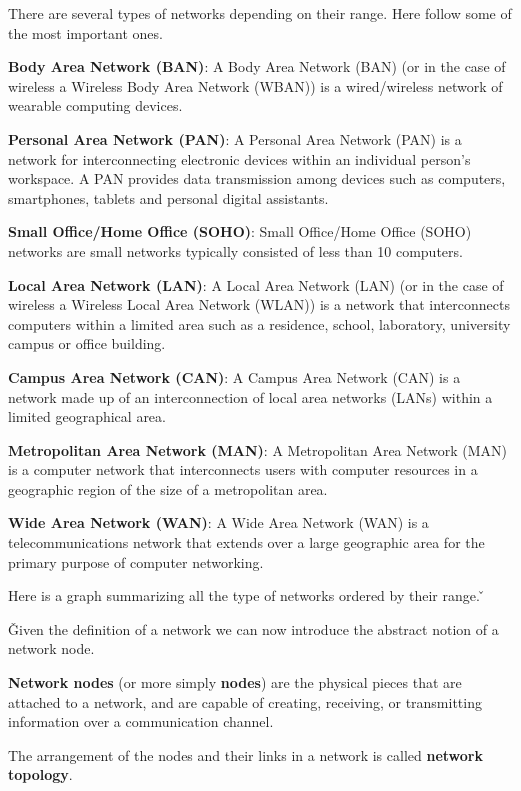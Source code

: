 There are several types of networks depending on their range. Here follow some of the most important ones.
\bit
\item \textbf{Body Area Network (BAN)}: A Body Area Network (BAN) (or in the case of wireless a Wireless Body Area
Network (WBAN)) is a wired/wireless network of wearable computing devices.
\item \textbf{Personal Area Network (PAN)}: A Personal Area Network (PAN) is a network for interconnecting electronic
devices within an individual person's workspace. A PAN provides data transmission among devices such as computers,
smartphones, tablets and personal digital assistants.
\item \textbf{Small Office/Home Office (SOHO)}: Small Office/Home Office (SOHO) networks are small networks typically
consisted of less than 10 computers.
\item \textbf{Local Area Network (LAN)}: A Local Area Network (LAN) (or in the case of wireless a Wireless Local Area
Network (WLAN)) is a network that interconnects computers within a limited area such as a residence, school,
laboratory, university campus or office building.
\item \textbf{Campus Area Network (CAN)}: A Campus Area Network (CAN) is a network made up of an interconnection of
local area networks (LANs) within a limited geographical area.
\item \textbf{Metropolitan Area Network (MAN)}: A Metropolitan Area Network (MAN) is a computer network that
interconnects users with computer resources in a geographic region of the size of a metropolitan area.
\item \textbf{Wide Area Network (WAN)}: A Wide Area Network (WAN) is a telecommunications network that extends over a
large geographic area for the primary purpose of computer networking.
\eit

Here is a graph summarizing all the type of networks ordered by their range. \v


\v

Given the definition of a network we can now introduce the abstract notion of a network node.

\textbf{Network nodes} (or more simply \textbf{nodes}) are the physical pieces that are attached to a network, and are
capable of creating, receiving, or transmitting information over a communication channel.
\ed

The arrangement of the nodes and their links in a network is called \textbf{network topology}.
\ed


